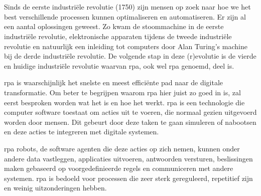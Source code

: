 
\chapter{}
\label{ch:inleiding}
Sinds de eerste industriële revolutie (1750) zijn mensen op zoek naar hoe we het best verschillende processen kunnen optimaliseren en automatiseren. Er zijn al een aantal oplossingen geweest. Zo kwam de stoommachine in de eerste industriële revolutie, elektronische apparaten tijdens de tweede industriële revolutie en natuurlijk een inleiding tot computers door Alan Turing's machine bij de derde industriële revolutie. De volgende stap in deze (r)evolutie is de vierde en huidige industriële revolutie waarvan \acrlong{rpa}, ook wel \acrshort{rpa} genoemd, deel is. \autocite{indusRev}

\acrshort{rpa} is waarschijnlijk het snelste en meest efficiënte pad naar de digitale transformatie. Om beter te begrijpen waarom \acrshort{rpa} hier juist zo goed in is, zal eerst besproken worden wat het is en hoe het werkt. \acrshort{rpa} is een technologie die computer software toestaat om acties uit te voeren, die normaal gezien uitgevoerd worden door mensen. Dit gebeurt door deze taken te gaan simuleren of nabootsen en deze acties te integreren met digitale systemen.

\acrshort{rpa} robots, de software agenten die deze acties op zich nemen, kunnen onder andere data vastleggen, applicaties uitvoeren, antwoorden versturen, beslissingen maken gebaseerd op voorgedefinieerde regels en communiceren met andere systemen. \acrshort{rpa} is bedoeld voor processen die zeer sterk gereguleerd, repetitief zijn en weinig uitzonderingen hebben.

